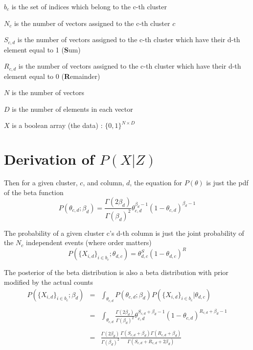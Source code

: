 \documentclass{article}
\begin{document}
$b_c$ is the set of indices which belong to the c-th cluster

$N_c$ is the number of vectors assigned to the c-th cluster $c$

$S_{c,d}$ is the number of vectors assigned to the c-th cluster which have their d-th element equal to 1 (\textbf{S}um)

$R_{c,d}$ is the number of vectors assigned to the c-th cluster which have their d-th element equal to 0 (\textbf{R}emainder)

$N$ is the number of vectors

$D$ is the number of elements in each vector

$X$ is a boolean array (the data) : $\{0,1\}^{N \times D}$

\section{Derivation of $P(X|Z)$}

Then for a given cluster, $c$, and column, $d$, the equation for $P(\theta)$ is just the pdf of the beta function
\begin{equation}
P(\theta_{c,d};\beta_d) = \frac{\Gamma(2\beta_d)}{\Gamma(\beta_d)^2}\theta_{c,d}^{\beta_d-1}(1-\theta_{c,d})^{\beta_d-1}
\end{equation}

The probability of a given cluster c's d-th column is just the joint probability of the $N_c$ independent events (where order matters)
\begin{equation}
P(\{X_{i,d}\}_{i \in b_c};\theta_{d,c}) = \theta_{d,c}^S (1-\theta_{d,c})^R
\end{equation}

The posterior of the beta distribution is also a beta distribution with prior modified by the actual counts
\begin{equation}
\begin{matrix}
P(\{X_{i,d}\}_{i \in b_c};\beta_d) & = & \int_{\theta_{c,d}} P(\theta_{c,d};\beta_d)P(\{X_{i,d}\}_{i \in b_c}|\theta_{d,c})
\\
\\ & = & \int_{\theta_{c,d}} \frac{\Gamma(2\beta_d)}{\Gamma(\beta_d)^2}\theta_{c,d}^{S_{c,d} + \beta_d-1}(1-\theta_{c,d})^{R_{c,d} + \beta_d-1} 
\\
\\ & = & \frac{\Gamma(2\beta_d)}{\Gamma(\beta_d)^2} \frac{\Gamma(S_{c,d} + \beta_d)\Gamma(R_{c,d} + \beta_d)}{\Gamma(S_{c,d} + R_{c,d} + 2 \beta_d)}
\end{matrix}
\end{equation}
\end{document}
